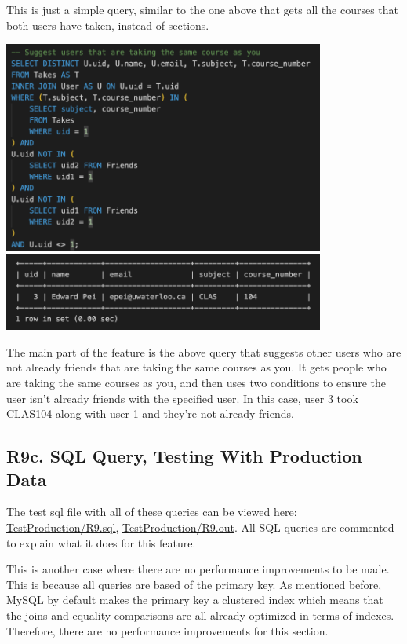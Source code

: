 \documentclass[12pt, a4paper]{article}
\begin{document}
This is just a simple query, similar to the one above that gets all the courses that both users have taken, instead of sections.
\begin{center}
    \includegraphics[width=400px]{R9/q4}
    \includegraphics[width=400px]{R9/q4out}
\end{center}
The main part of the feature is the above query that suggests other users who are not already friends that are taking the same courses as you. It gets people who are taking the same courses as you, and then uses two conditions to ensure the user isn't already friends with the specified user. In this case, user 3 took CLAS104 along with user 1 and they're not already friends.
\subsection*{R9c. SQL Query, Testing With Production Data}
The test sql file with all of these queries can be viewed here: \underline{\href{https://github.com/Kggupta/DegreeMap/tree/main/Database/Queries/TestProduction}{TestProduction/R9.sql}}, \underline{\href{https://github.com/Kggupta/DegreeMap/tree/main/Database/Queries/TestProduction}{TestProduction/R9.out}}. All SQL queries are commented to explain what it does for this feature.

This is another case where there are no performance improvements to be made. This is because all queries are based of the primary key. As mentioned before, MySQL by default makes the primary key a clustered index which means that the joins and equality comparisons are all already optimized in terms of indexes. Therefore, there are no performance improvements for this section.
\end{document}
